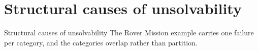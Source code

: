 \section{Structural causes of unsolvability}

\begin{frame}{Structural causes of unsolvability}
    The Rover Mission example carries one failure per category, and the categories overlap rather than partition.

    \vspace*{-0.4em}
    \begin{center}
        \scalebox{0.93}{}
    \end{center}

\end{frame}
